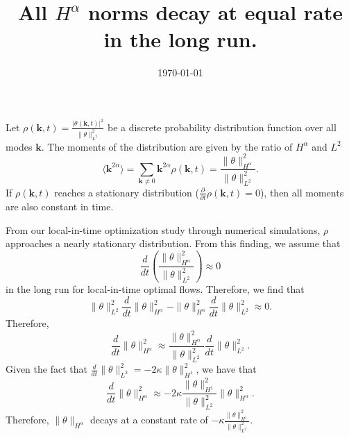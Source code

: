 \documentclass[12pt]{article}
\begin{document}
\title{All $H^{\alpha}$ norms decay at equal rate in the long run.}
\author{}
\date{\today}


\maketitle


Let $\rho(\mathbf{k},t)=\frac{|\theta(\mathbf{k},t)|^{2}}{\|\theta\|^{2}_{L^2}}$ be a discrete probability distribution function over all modes $\mathbf{k}$.  The moments of the distribution are given by the ratio of $H^{\alpha}$ and $L^{2}$
\begin{equation}
\langle \mathbf{k}^{2\alpha} \rangle=\sum_{\mathbf{k}\neq 0} \mathbf{k}^{2\alpha}\rho(\mathbf{k},t) = \frac{\|\theta\|_{H^{\alpha}}^2}{\|\theta\|_{L^{2}}^2}.
\end{equation}
If $\rho(\mathbf{k},t)$ reaches a stationary distribution ($\frac{\partial}{\partial t}\rho(\mathbf{k},t) = 0$), then all moments are also constant in time. 

From our local-in-time optimization study through numerical simulations, $\rho$ approaches a nearly stationary distribution. From this finding, we assume that
\begin{equation}
\frac{d}{dt}\left(\frac{\|\theta\|_{H^{\alpha}}^2}{\|\theta\|_{L^{2}}^2}\right) \approx 0 
\end{equation}
 in the long run for local-in-time optimal flows. Therefore, we find that 
\begin{equation}
\|\theta\|_{L^{2}}^2\frac{d}{dt}\|\theta\|_{H^{\alpha}}^2 -\|\theta\|_{H^{\alpha}}^2\frac{d}{dt}\|\theta\|_{L^{2}}^2 \approx 0.
\end{equation}
Therefore,
\begin{equation}
\frac{d}{dt}\|\theta\|_{H^{\alpha}}^2 \approx \frac{\|\theta\|_{H^{\alpha}}^2}{\|\theta\|_{L^{2}}^2}\frac{d}{dt}\|\theta\|_{L^{2}}^2. 
\end{equation}
Given the fact that $\frac{d}{dt}\|\theta\|_{L^{2}}^2 = -2\kappa \|\theta\|_{H^{1}}^{2}$, we have that
\begin{equation}
\frac{d}{dt}\|\theta\|_{H^{\alpha}}^2 \approx -2\kappa\frac{\|\theta\|_{H^{1}}^2}{\|\theta\|_{L^{2}}^2} \|\theta\|_{H^{\alpha}}^{2}. 
\end{equation}
Therefore, $\|\theta\|_{H^{\alpha}}$ decays at a constant rate of $-\kappa\frac{\|\theta\|_{H^{1}}^2}{\|\theta\|_{L^{2}}^2}$.
\end{document}

